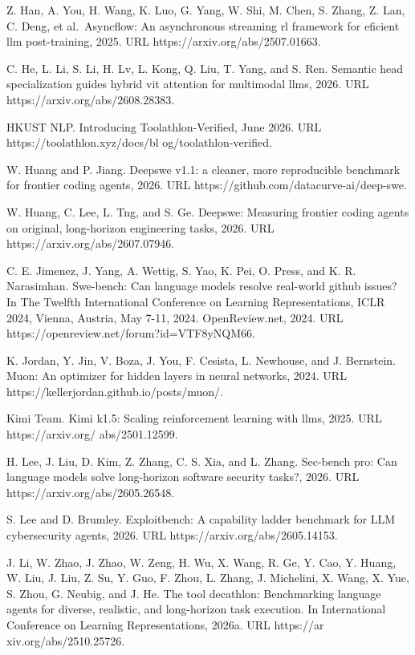 \documentclass[
  10
]{article}
\begin{document}
Z. Han, A. You, H. Wang, K. Luo, G. Yang, W. Shi, M. Chen, S. Zhang, Z.
Lan, C. Deng, et al.~Asyncflow: An asynchronous streaming rl framework
for eficient llm post-training, 2025. URL
https://arxiv.org/abs/2507.01663.

C. He, L. Li, S. Li, H. Lv, L. Kong, Q. Liu, T. Yang, and S. Ren.
Semantic head specialization guides hybrid vit attention for multimodal
llms, 2026. URL https://arxiv.org/abs/2608.28383.

HKUST NLP. Introducing Toolathlon-Verified, June 2026. URL
https://toolathlon.xyz/docs/bl og/toolathlon-verified.

W. Huang and P. Jiang. Deepswe v1.1: a cleaner, more reproducible
benchmark for frontier coding agents, 2026. URL
https://github.com/datacurve-ai/deep-swe.

W. Huang, C. Lee, L. Tng, and S. Ge. Deepswe: Measuring frontier coding
agents on original, long-horizon engineering tasks, 2026. URL
https://arxiv.org/abs/2607.07946.

C. E. Jimenez, J. Yang, A. Wettig, S. Yao, K. Pei, O. Press, and K. R.
Narasimhan. Swe-bench: Can language models resolve real-world github
issues? In The Twelfth International Conference on Learning
Representations, ICLR 2024, Vienna, Austria, May 7-11, 2024.
OpenReview.net, 2024. URL https://openreview.net/forum?id=VTF8yNQM66.

K. Jordan, Y. Jin, V. Boza, J. You, F. Cesista, L. Newhouse, and J.
Bernstein. Muon: An optimizer for hidden layers in neural networks,
2024. URL https://kellerjordan.github.io/posts/muon/.

Kimi Team. Kimi k1.5: Scaling reinforcement learning with llms, 2025.
URL https://arxiv.org/ abs/2501.12599.

H. Lee, J. Liu, D. Kim, Z. Zhang, C. S. Xia, and L. Zhang. Sec-bench
pro: Can language models solve long-horizon software security tasks?,
2026. URL https://arxiv.org/abs/2605.26548.

S. Lee and D. Brumley. Exploitbench: A capability ladder benchmark for
LLM cybersecurity agents, 2026. URL https://arxiv.org/abs/2605.14153.

J. Li, W. Zhao, J. Zhao, W. Zeng, H. Wu, X. Wang, R. Ge, Y. Cao, Y.
Huang, W. Liu, J. Liu, Z. Su, Y. Guo, F. Zhou, L. Zhang, J. Michelini,
X. Wang, X. Yue, S. Zhou, G. Neubig, and J. He. The tool decathlon:
Benchmarking language agents for diverse, realistic, and long-horizon
task execution. In International Conference on Learning Representations,
2026a. URL https://ar xiv.org/abs/2510.25726.
\end{document}
